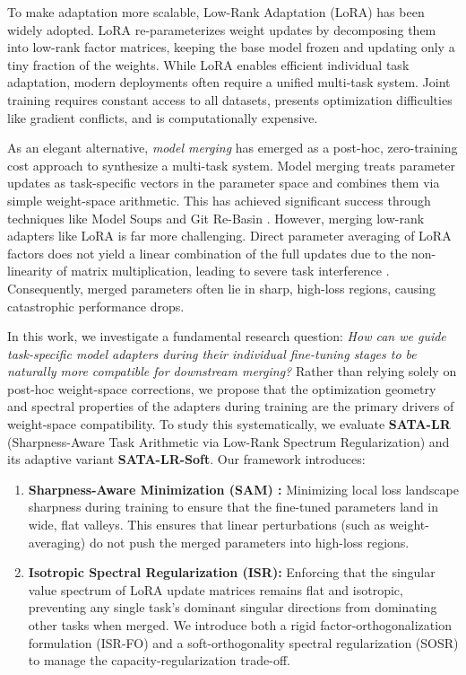 \documentclass{article}
\begin{document}
To make adaptation more scalable, Low-Rank Adaptation (LoRA) \cite{hu2021lora} has been widely adopted. LoRA re-parameterizes weight updates by decomposing them into low-rank factor matrices, keeping the base model frozen and updating only a tiny fraction of the weights. While LoRA enables efficient individual task adaptation, modern deployments often require a unified multi-task system. Joint training requires constant access to all datasets, presents optimization difficulties like gradient conflicts, and is computationally expensive.

As an elegant alternative, \emph{model merging} \cite{yang2024model, li2023deep} has emerged as a post-hoc, zero-training cost approach to synthesize a multi-task system. Model merging treats parameter updates as task-specific vectors in the parameter space \cite{ilharco2022editing} and combines them via simple weight-space arithmetic. This has achieved significant success through techniques like Model Soups \cite{wortsman2022model} and Git Re-Basin \cite{ainsworth2023git}. However, merging low-rank adapters like LoRA is far more challenging. Direct parameter averaging of LoRA factors does not yield a linear combination of the full updates due to the non-linearity of matrix multiplication, leading to severe task interference \cite{yadav2024merging}. Consequently, merged parameters often lie in sharp, high-loss regions, causing catastrophic performance drops.

In this work, we investigate a fundamental research question: \emph{How can we guide task-specific model adapters during their individual fine-tuning stages to be naturally more compatible for downstream merging?} Rather than relying solely on post-hoc weight-space corrections, we propose that the optimization geometry and spectral properties of the adapters during training are the primary drivers of weight-space compatibility. To study this systematically, we evaluate \textbf{SATA-LR} (Sharpness-Aware Task Arithmetic via Low-Rank Spectrum Regularization) and its adaptive variant \textbf{SATA-LR-Soft}. Our framework introduces:
\begin{enumerate}\setlength{\itemsep}{0pt}\setlength{\parsep}{0pt}
    \item \textbf{Sharpness-Aware Minimization (SAM) \cite{foret2020sharpness}:} Minimizing local loss landscape sharpness during training to ensure that the fine-tuned parameters land in wide, flat valleys. This ensures that linear perturbations (such as weight-averaging) do not push the merged parameters into high-loss regions.
    \item \textbf{Isotropic Spectral Regularization (ISR):} Enforcing that the singular value spectrum of LoRA update matrices remains flat and isotropic, preventing any single task's dominant singular directions from dominating other tasks when merged. We introduce both a rigid factor-orthogonalization formulation (ISR-FO) and a soft-orthogonality spectral regularization (SOSR) to manage the capacity-regularization trade-off.
\end{enumerate}
\end{document}
